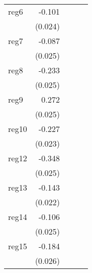 {\begin{longtable}{l*{4}{D{.}{.}{-1}}}
\addlinespace
reg6        &      -0.101\sym{***}&                     &                     &                     \\
            &     (0.024)         &                     &                     &                     \\
\addlinespace
reg7        &      -0.087\sym{***}&                     &                     &                     \\
            &     (0.025)         &                     &                     &                     \\
\addlinespace
reg8        &      -0.233\sym{***}&                     &                     &                     \\
            &     (0.025)         &                     &                     &                     \\
\addlinespace
reg9        &       0.272\sym{***}&                     &                     &                     \\
            &     (0.025)         &                     &                     &                     \\
\addlinespace
reg10       &      -0.227\sym{***}&                     &                     &                     \\
            &     (0.023)         &                     &                     &                     \\
\addlinespace
reg12       &      -0.348\sym{***}&                     &                     &                     \\
            &     (0.025)         &                     &                     &                     \\
\addlinespace
reg13       &      -0.143\sym{***}&                     &                     &                     \\
            &     (0.022)         &                     &                     &                     \\
\addlinespace
reg14       &      -0.106\sym{***}&                     &                     &                     \\
            &     (0.025)         &                     &                     &                     \\
\addlinespace
reg15       &      -0.184\sym{***}&                     &                     &                     \\
            &     (0.026)         &                     &                     &                     \\

\end{longtable}}
